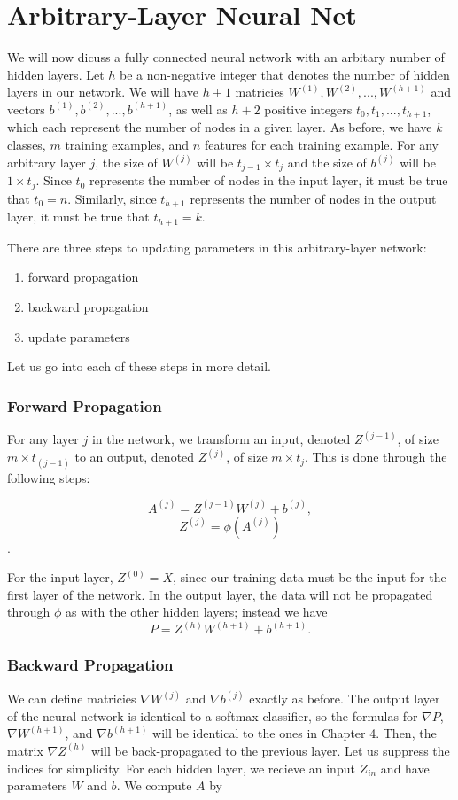 \newpage
\section{Arbitrary-Layer Neural Net}
We will now dicuss a fully connected neural network with an arbitary number of
hidden layers. Let $h$ be a non-negative integer that denotes the number of
hidden layers in our network. We will have $h+1$ matricies $W^{(1)}, W^{(2)},
..., W^{(h+1)}$ and vectors $b^{(1)}, b^{(2)}, ..., b^{(h+1)}$, as well as
$h+2$ positive integers $t_0, t_1, ..., t_{h+1}$, which each represent the number
of nodes in a given layer. As before, we have $k$ classes, $m$ training
examples, and $n$ features for each training example. For any arbitrary layer
$j$, the size of $W^{(j)}$ will be $t_{j-1} \times t_j$ and the size of
$b^{(j)}$ will be $1 \times t_j$. Since $t_0$ represents the number of nodes in
the input layer, it must be true that $t_0 = n$. Similarly, since $t_{h+1}$
represents the number of nodes in the output layer, it must be true that
$t_{h+1} = k$.

There are three steps to updating parameters in this arbitrary-layer network:
\begin{enumerate}
\item forward propagation
\item backward propagation
\item update parameters
\end{enumerate}

Let us go into each of these steps in more detail.

\subsubsection{Forward Propagation}
For any layer $j$ in the network, we transform an input, denoted $Z^{(j-1)}$,
of size $m \times t_{(j-1)}$ to an output, denoted $Z^{(j)}$, of size $m \times
t_j$. This is done through the following steps:

$$ A^{(j)} = Z^{(j-1)} W^{(j)} + b^{(j)}, $$
$$ Z^{(j)} = \phi ( A^{(j)} )$$.

For the input layer, $Z^{(0)} = X$, since our training data must be the input
for the first layer of the network. In the output layer, the data will not be
propagated through $\phi$ as with the other hidden layers; instead we have
$$ P = Z^{(h)} W^{(h+1)} + b^{(h+1)}. $$


\subsubsection{Backward Propagation}
We can define matricies $\nabla W^{(j)}$ and $\nabla b^{(j)}$ exactly as
before. The output layer of the neural network is identical to a softmax
classifier, so the formulas for $\nabla P$, $\nabla W^{(h+1)}$, and $\nabla
b^{(h+1)}$ will be identical to the ones in Chapter 4.
Then, the matrix $\nabla Z^{(h)}$ will be back-propagated to the previous
layer. Let us suppress the indices for simplicity. For each hidden layer, we
recieve an input $Z_{in}$ and have parameters $W$ and $b$. We compute $A$ by

